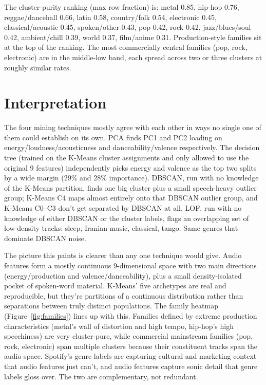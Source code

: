 \documentclass[10pt,twocolumn]{article}
\begin{document}
The cluster-purity ranking (max row fraction) is: metal 0.85, hip-hop 0.76, reggae/dancehall 0.66, latin 0.58, country/folk 0.54, electronic 0.45, classical/acoustic 0.45, spoken/other 0.43, pop 0.42, rock 0.42, jazz/blues/soul 0.42, ambient/chill 0.39, world 0.37, film/anime 0.31. Production-style families sit at the top of the ranking. The most commercially central families (pop, rock, electronic) are in the middle-low band, each spread across two or three clusters at roughly similar rates.

\section{Interpretation}

The four mining techniques mostly agree with each other in ways no single one of them could establish on its own. PCA finds PC1 and PC2 loading on energy/loudness/acousticness and danceability/valence respectively. The decision tree (trained on the K-Means cluster assignments and only allowed to use the original 9 features) independently picks energy and valence as the top two splits by a wide margin (29\% and 28\% importance). DBSCAN, run with no knowledge of the K-Means partition, finds one big cluster plus a small speech-heavy outlier group; K-Means C4 maps almost entirely onto that DBSCAN outlier group, and K-Means C0--C3 don't get separated by DBSCAN at all. LOF, run with no knowledge of either DBSCAN or the cluster labels, flags an overlapping set of low-density tracks: sleep, Iranian music, classical, tango. Same genres that dominate DBSCAN noise.

The picture this paints is clearer than any one technique would give. Audio features form a mostly continuous 9-dimensional space with two main directions (energy/production and valence/danceability), plus a small density-isolated pocket of spoken-word material. K-Means' five archetypes are real and reproducible, but they're partitions of a continuous distribution rather than separations between truly distinct populations. The family heatmap (Figure~\ref{fig:families}) lines up with this. Families defined by extreme production characteristics (metal's wall of distortion and high tempo, hip-hop's high speechiness) are very cluster-pure, while commercial mainstream families (pop, rock, electronic) span multiple clusters because their constituent tracks span the audio space. Spotify's genre labels are capturing cultural and marketing context that audio features just can't, and audio features capture sonic detail that genre labels gloss over. The two are complementary, not redundant.
\end{document}
